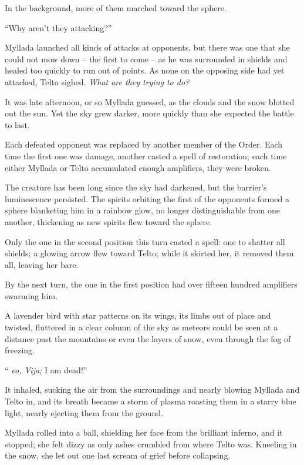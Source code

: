 In the background, more of them marched toward the sphere.

``Why aren't they attacking?''

Myllada launched all kinds of attacks at opponents, but there was one that she could not mow down -- the first to come -- as he was surrounded in shields and healed too quickly to run out of points. As none on the opposing side had yet attacked, Telto sighed. \emph{What are they trying to do?}

It was late afternoon, or so Myllada guessed, as the clouds and the snow blotted out the sun. Yet the sky grew darker, more quickly than she expected the battle to last.

Each defeated opponent was replaced by another member of the Order. Each time the first one was damage, another casted a spell of restoration; each time either Myllada or Telto accumulated enough amplifiers, they were broken.

\centeredstars

The creature has been long since the sky had darkened, but the barrier's luminescence persisted. The spirits orbiting the first of the opponents formed a sphere blanketing him in a rainbow glow, no longer distinguishable from one another, thickening as new spirits flew toward the sphere.

Only the one in the second position this turn casted a spell: one to shatter all shields; a glowing arrow flew toward Telto; while it skirted her, it removed them all, leaving her bare.

By the next turn, the one in the first position had over fifteen hundred amplifiers swarming him.

A lavender bird with star patterns on its wings, its limbs out of place and twisted, fluttered in a clear column of the sky as meteors could be seen at a distance past the mountains or even the layers of snow, even through the fog of freezing.

``\emph{\Sja{} eo, Vija;} I am dead!''

It inhaled, sucking the air from the surroundings and nearly blowing Myllada and Telto in, and its breath became a storm of plasma roasting them in a starry blue light, nearly ejecting them from the ground.

Myllada rolled into a ball, shielding her face from the brilliant inferno, and it stopped; she felt dizzy as only ashes crumbled from where Telto was. Kneeling in the snow, she let out one last scream of grief before collapsing.

